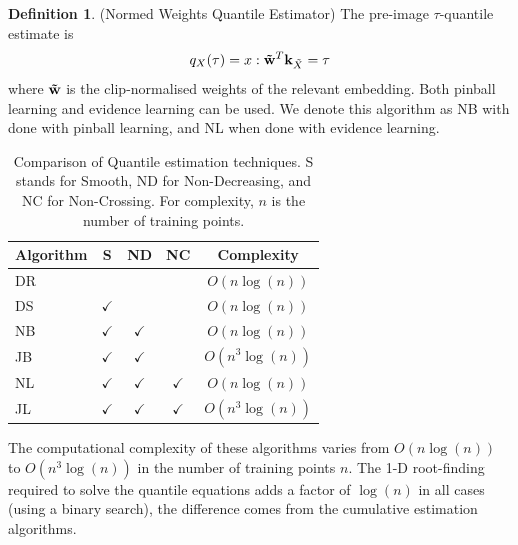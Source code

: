 \documentclass[twoside]{article} \usepackage{aistats2017}
\theoremstyle{definition}
\newtheorem{definition}[theorem]{Definition}
\newcommand{\rv}[1]{{#1}}
\newcommand{\ds}[1]{\tilde{#1}}
\begin{document}
	\theoremstyle{definition}
	\begin{definition}
		(Normed Weights Quantile Estimator)
		The pre-image $\tau$-quantile estimate is
		\begin{equation}
		q_{\rv{X}}(\tau) = x : \bvec{\tilde{w}}^{T} \bvec{k}_{\ds{X}} = \tau
		\end{equation}
		where $\mathbf{\tilde{w}}$ is the clip-normalised weights of the relevant embedding.
		Both pinball learning and evidence learning can be used. We denote this algorithm as NB with done with pinball learning, and NL when done with evidence learning.
	\end{definition}	
	
	\begin{table}[t!]
		\begin{center}
			\begin{tabular}{l|cccc}
				Algorithm & S & ND &   NC & Complexity \\ \hline
				DR  &              &                &                & $O(n \log(n))$    \\
				DS  & $\checkmark$ &                &                &
				$O(n \log(n))$  \\
				NB  & $\checkmark$ & $\checkmark$   &                &
				$O(n \log(n))$ \\
				JB  & $\checkmark$ & $\checkmark$   &                &
				$O(n^{3} \log(n))$ \\
				NL  & $\checkmark$ & $\checkmark$   & $\checkmark$   &
				$O(n \log(n))$ \\
				JL  & $\checkmark$ & $\checkmark$   & $\checkmark$   &   $O(n^{3} \log(n))$ 
			\end{tabular}
		\end{center}
		\caption{Comparison of Quantile estimation techniques. S stands for Smooth, ND for Non-Decreasing, and NC for Non-Crossing. For complexity, $n$ is the number of training points.}
		\label{table:quantile_regression_methods}
	\end{table}
	
		
	The computational complexity of these algorithms varies from $O(n \log(n))$ to $O(n^{3} \log(n))$ in the number of training points $n$. The 1-D root-finding required to solve the quantile equations adds a factor of $\log(n)$ in all cases (using a binary search), the difference comes from the cumulative estimation algorithms.
	
\end{document}
